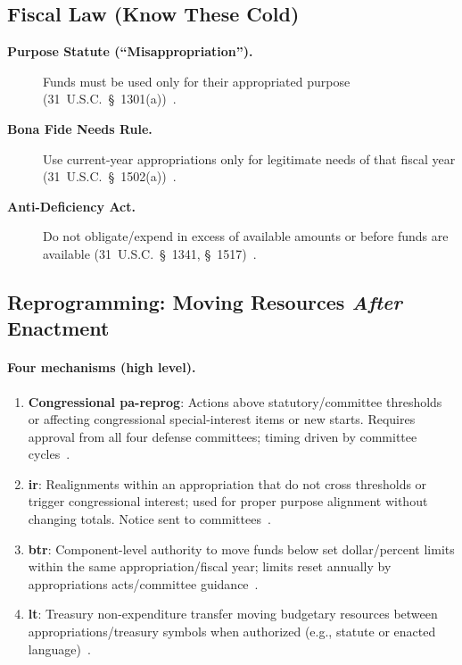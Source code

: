 \documentclass[../main.tex]{subfiles}
\begin{document}
\subsection{Fiscal Law (Know These Cold)}
\begin{description}
  \item[\textbf{Purpose Statute (``Misappropriation'').}] Funds must be used only for their appropriated purpose (31~U.S.C.~\S~1301(a))~\autocite{USC-1301-Purpose}.
  \item[\textbf{Bona Fide Needs Rule.}] Use current-year appropriations only for legitimate needs of that fiscal year (31~U.S.C.~\S~1502(a))~\autocite{USC-1502-BFN}.
  \item[\textbf{Anti-Deficiency Act.}] Do not obligate/expend in excess of available amounts or before funds are available (31~U.S.C.~\S~1341, \S~1517)~\autocite{USC-1341-ADA}.
\end{description}

\subsection{Reprogramming: Moving Resources \emph{After} Enactment}
\paragraph*{Four mechanisms (high level).}
\begin{enumerate}
  \item \textbf{Congressional \ac{pa-reprog}}: Actions above statutory/committee thresholds or affecting congressional special-interest items or new starts. Requires approval from all four defense committees; timing driven by committee cycles~\autocite{DoDFMR-Vol3}.
  \item \textbf{\ac{ir}}: Realignments within an appropriation that do not cross thresholds or trigger congressional interest; used for proper purpose alignment without changing totals. Notice sent to committees~\autocite{DoDFMR-Vol3}.
  \item \textbf{\ac{btr}}: Component-level authority to move funds below set dollar/percent limits within the same appropriation/fiscal year; limits reset annually by appropriations acts/committee guidance~\autocite{DoDFMR-Vol3}.
  \item \textbf{\ac{lt}}: Treasury non-expenditure transfer moving budgetary resources between appropriations/treasury symbols when authorized (e.g., statute or enacted language)~\autocite{DoDFMR-Vol3}.
\end{enumerate}
\end{document}
